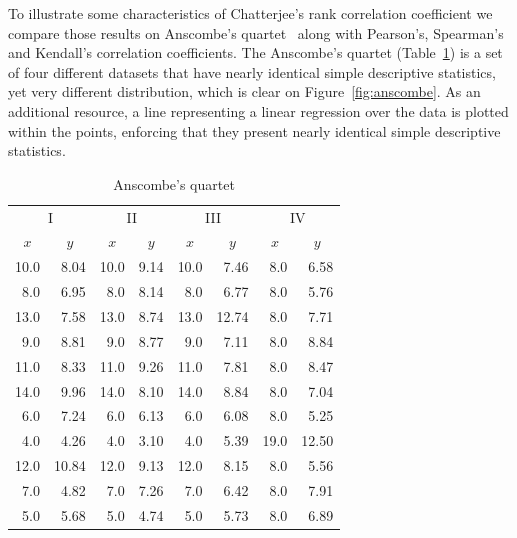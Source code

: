 To illustrate some characteristics of Chatterjee's rank correlation coefficient we compare those results on Anscombe's quartet~\citep{anscombe1973} along with Pearson's, Spearman's and Kendall's correlation coefficients. The Anscombe's quartet (Table~\ref{tab:anscombe}) is a set of four different datasets that have nearly identical simple descriptive statistics, yet very different distribution, which is clear on Figure~\ref{fig:anscombe}. As an additional resource, a line representing a linear regression over the data is plotted within the points, enforcing that they present nearly identical simple descriptive statistics.

\begin{table}[ht]
\centering
\caption{Anscombe's quartet}
\label{tab:anscombe}
\begin{tabular}{rr|rr|rr|rr}
\toprule
\multicolumn{2}{c|}{I} & \multicolumn{2}{c|}{II} & \multicolumn{2}{c|}{III} & \multicolumn{2}{c}{IV} \\

\multicolumn{1}{c}{$x$} & \multicolumn{1}{c|}{$y$} & \multicolumn{1}{c}{$x$} & \multicolumn{1}{c|}{$y$} & \multicolumn{1}{c}{$x$} & \multicolumn{1}{c|}{$y$} & \multicolumn{1}{c}{$x$} & \multicolumn{1}{c}{$y$} \\
\midrule
10.0 & 8.04 & 10.0 & 9.14 & 10.0 & 7.46 & 8.0 & 6.58 \\
8.0 & 6.95 & 8.0 & 8.14 & 8.0 & 6.77 & 8.0 & 5.76 \\
13.0 & 7.58 & 13.0 & 8.74 & 13.0 & 12.74 & 8.0 & 7.71 \\
9.0 & 8.81 & 9.0 & 8.77 & 9.0 & 7.11 & 8.0 & 8.84 \\
11.0 & 8.33 & 11.0 & 9.26 & 11.0 & 7.81 & 8.0 & 8.47 \\
14.0 & 9.96 & 14.0 & 8.10 & 14.0 & 8.84 & 8.0 & 7.04 \\
6.0 & 7.24 & 6.0 & 6.13 & 6.0 & 6.08 & 8.0 & 5.25 \\
4.0 & 4.26 & 4.0 & 3.10 & 4.0 & 5.39 & 19.0 & 12.50 \\
12.0 & 10.84 & 12.0 & 9.13 & 12.0 & 8.15 & 8.0 & 5.56 \\
7.0 & 4.82 & 7.0 & 7.26 & 7.0 & 6.42 & 8.0 & 7.91 \\
5.0 & 5.68 & 5.0 & 4.74 & 5.0 & 5.73 & 8.0 & 6.89 \\
\bottomrule
\end{tabular}
\end{table}

